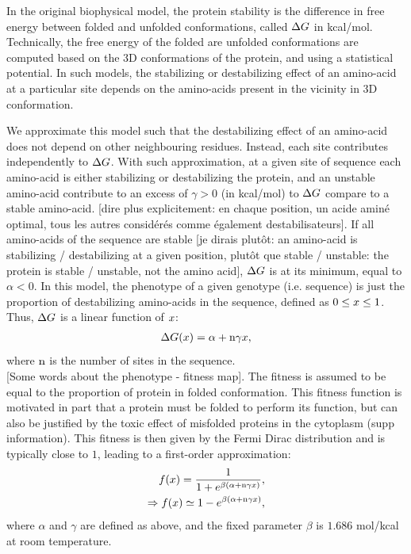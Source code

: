 \documentclass{article}
\begin{document}
	In the original biophysical model, the protein stability is the difference in free energy between folded and unfolded conformations, called $\Delta G$ in kcal/mol.
	Technically, the free energy of the folded are unfolded conformations are computed based on the $3$D conformations of the protein, and using a statistical potential.
	In such models, the stabilizing or destabilizing effect of an amino-acid at a particular site depends on the amino-acids present in the vicinity in $3$D conformation.
	
	We approximate this model such that the destabilizing effect of an amino-acid does not depend on other neighbouring residues. Instead, each site contributes independently to $\Delta G$. 
	With such approximation, at a given site of sequence each amino-acid is either stabilizing or destabilizing the protein, and an unstable amino-acid contribute to an excess of $\gamma > 0$ (in kcal/mol) to $\Delta G$ compare to a stable amino-acid. [dire plus explicitement: en chaque position, un acide aminé optimal, tous les autres considérés comme également destabilisateurs].
	If all amino-acids of the sequence are stable [je dirais plutôt: an amino-acid is stabilizing / destabilizing at a given position, plutôt que stable / unstable: the protein is stable / unstable, not the amino acid], $\Delta G$ is at its minimum, equal to $ \alpha < 0$. 
	In this model, the phenotype of a given genotype (i.e. sequence) is just the proportion of destabilizing amino-acids in the sequence, defined as $0 \leq x \leq 1$. Thus, $\Delta G$ is a linear function of $x$:
	\begin{align}
	\Delta G (x) = \alpha + \text{n} \gamma x,
	\end{align}
	where $\text{n}$ is the number of sites in the sequence. \\
	
	[Some words about the phenotype - fitness map]. The fitness is assumed to be equal to the proportion of protein in folded conformation. This fitness function is motivated in part that a protein must be folded to perform its function, but can also be justified by the toxic effect of misfolded proteins in the cytoplasm (supp information).
	This fitness is then given by the Fermi Dirac distribution and is typically close to $1$, leading to a first-order approximation\cite{Goldstein2011}: 
	\begin{align}
	f(x) = \dfrac{1}{1 + e^{\beta (\alpha + \text{n} \gamma x)}},\\
	\Rightarrow f(x) \simeq 1 - e^{\beta (\alpha + \text{n} \gamma x)}, 
	\end{align}
	where $\alpha$ and $\gamma$ are defined as above, and the fixed parameter $\beta$ is $1.686$ mol/kcal at room temperature.
	
\end{document}
